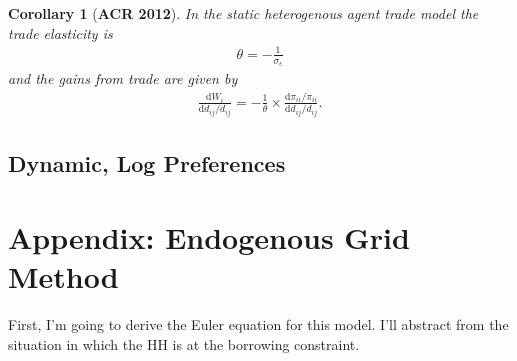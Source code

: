 \documentclass[12pt,pdftex]{article}
\newtheorem{corr}{Corollary}
\begin{document}
\begin{onehalfspacing}
\begin{corr}[\textbf{ACR 2012}] In the static heterogenous agent trade model the trade elasticity is
\begin{align}
\theta = -\frac{1}{\sigma_{\epsilon}} \nonumber
\end{align}
and the gains from trade are given by
\begin{align}
\frac{\mathrm{d} W_{i}}{\mathrm{d} d_{ij} / d_{ij}} = -\frac{1}{\theta} \times \frac{\mathrm{d} \pi_{ii} / \pi_{ii}}{\mathrm{d}d_{ij} / d_{ij}}.
\end{align}
\end{corr}

\subsection{Dynamic, Log Preferences}


\newpage


\section{Appendix: Endogenous Grid Method}

First, I'm going to derive the Euler equation for this model. I'll abstract from the situation in which the HH is at the borrowing constraint.


\end{onehalfspacing}
\end{document}
